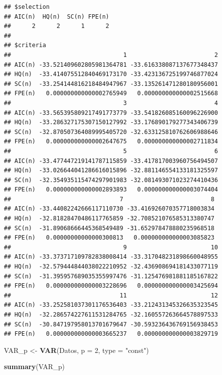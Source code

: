 \documentclass[
]{book}
\newenvironment{Shaded}{\begin{snugshade}}{\end{snugshade}}
\newcommand{\AttributeTok}[1]{\textcolor[rgb]{0.13,0.29,0.53}{#1}}
\newcommand{\DecValTok}[1]{\textcolor[rgb]{0.00,0.00,0.81}{#1}}
\newcommand{\FunctionTok}[1]{\textcolor[rgb]{0.13,0.29,0.53}{\textbf{#1}}}
\newcommand{\NormalTok}[1]{#1}
\newcommand{\OtherTok}[1]{\textcolor[rgb]{0.56,0.35,0.01}{#1}}
\newcommand{\StringTok}[1]{\textcolor[rgb]{0.31,0.60,0.02}{#1}}
\begin{document}
\begin{verbatim}
## $selection
## AIC(n)  HQ(n)  SC(n) FPE(n) 
##      2      2      1      2 
## 
## $criteria
##                                1                         2
## AIC(n) -33.521409602805981364781 -33.616338087137677348437
## HQ(n)  -33.414075512840469173170 -33.423136725199746877024
## SC(n)  -33.254144816218484947967 -33.135261471280180956001
## FPE(n)   0.000000000000002765949   0.000000000000002515668
##                                3                         4
## AIC(n) -33.565395809217491773779 -33.541826085160096226900
## HQ(n)  -33.286327175307150127992 -33.176890179277343406739
## SC(n)  -32.870507364089995405720 -32.633125810762606988646
## FPE(n)   0.000000000000002647675   0.000000000000002711834
##                                5                         6
## AIC(n) -33.477447219141787115859 -33.417817003960756494507
## HQ(n)  -33.026644041286616015896 -32.881146554133181325597
## SC(n)  -32.354935115474297901983 -32.081493071023274410436
## FPE(n)   0.000000000000002893893   0.000000000000003074404
##                               7                         8
## AIC(n) -33.44082242666117110730 -33.416926070357718003834
## HQ(n)  -32.81828470486117765859 -32.708521076585313380747
## SC(n)  -31.89068666445368549489 -31.652978478880235968518
## FPE(n)   0.00000000000000300813   0.000000000000003085823
##                                9                        10
## AIC(n) -33.373717109782838008414 -33.317048231898660048955
## HQ(n)  -32.579444844038022210952 -32.436908694181433077119
## SC(n)  -31.395957689035355997476 -31.125476981881185167822
## FPE(n)   0.000000000000003228696   0.000000000000003425694
##                               11                        12
## AIC(n) -33.252581037301176536403 -33.212431345326635323545
## HQ(n)  -32.286574227611531284765 -32.160557263664578897533
## SC(n)  -30.847197958013701679647 -30.593236436769156938453
## FPE(n)   0.000000000000003665237   0.000000000000003829719
\end{verbatim}

\begin{Shaded}
\begin{Highlighting}[]
\NormalTok{VAR\_p }\OtherTok{\textless{}{-}} \FunctionTok{VAR}\NormalTok{(Datos, }\AttributeTok{p =} \DecValTok{2}\NormalTok{, }\AttributeTok{type =} \StringTok{"const"}\NormalTok{)}

\FunctionTok{summary}\NormalTok{(VAR\_p)}
\end{Highlighting}
\end{Shaded}
\end{document}
